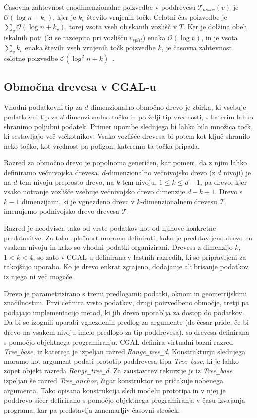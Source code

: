\documentclass[a4paper, 12pt]{book}
\newcommand{\T}{\ensuremath{\mathcal{T}}}
\newcommand{\OO}{\ensuremath{\mathcal{O}}} %
\newcommand{\U}{\texttt{\_}}
\begin{document}
Časovna zahtevnost enodimenzionalne poizvedbe v poddrevesu $\T_{assoc}(v)$ je $\OO(\log n + k_v)$, kjer je $k_v$ število vrnjenih točk. Celotni čas poizvedbe je $\sum_v\OO(\log n + k_v)$, torej vsota vseh obiskanih vozlišč v $T$. Ker je dolžina obeh iskalnih poti (ki se razcepita pri vozlišču $v_{split}$) enaka $\OO(\log n)$, in je vsota $\sum_v k_v$ enaka številu vseh vrnjenih točk poizvedbe $k$, je časovna zahtevnost celotne poizvedbe $\OO(\log^2n + k)$~\cite[poglavje 5.3]{bkos-08-all}.

\subsection{Območna drevesa v CGAL-u}
Vhodni podatkovni tip za $d$-dimenzionalno območno drevo je zbirka, ki vsebuje podatkovni tip za $d$-dimenzionalno točko in po želji tip vrednosti, s katerim lahko shranimo poljubni podatek. Primer uporabe slednjega bi lahko bila množica točk, ki sestavljajo več večkotnikov. Vsako vozlišče drevesa bi potem kot ključ shranilo neko točko, kot vrednost pa poligon, kateremu ta točka pripada. 

Razred za območno drevo je popolnoma generičen, kar pomeni, da z njim lahko definiramo večnivojska drevesa. $d$-dimenzionalno večnivojsko drevo  (z $d$ nivoji) je na $d$-tem nivoju preprosto drevo, na $k$-tem nivoju, $1 \leq k \leq d-1$, pa drevo, kjer vsako notranje vozlišče vsebuje večnivojsko drevo dimenzije $d-k+1$. Drevo s $k-1$ dimenzijami, ki je vgnezdeno drevo v $k$-dimenzionalnem drevesu \T, imenujemo podnivojsko drevo drevesa \T. 


Razred je neodvisen tako od vrste podatkov kot od njihove konkretne predstavitve. Za tako splošnost moramo definirati, kako je predstavljeno drevo na vsakem nivoju in kako so vhodni podatki organizirani. Drevesa z dimenzijo $k$, $ 1 < k < 4$, so zato v CGAL-u definirana v lastnih razredih, ki so pripravljeni za takojšnjo uporabo. Ko je drevo enkrat zgrajeno, dodajanje ali brisanje podatkov iz njega ni več mogoče.

\bigbreak
Drevo je parametrizirano s tremi predlogami: podatki, oknom in geometrijskimi značilnostmi. Prvi definira vrsto podatkov, drugi poizvedbeno območje, tretji pa podajajo implementacijo metod, ki jih drevo uporablja za dostop do podatkov. Da bi se izognili uporabi vgnezdenih predlog za argumente (do česar pride, če bi drevo na vsakem nivoju imelo predlogo za tip poddrevesa), so drevesa definirana s pomočjo objektnega programiranja. CGAL definira virtualni bazni razred \textit{Tree\U base}, iz katerega je izpeljan razred \textit{Range\U tree\U d}. Konstrukturju slednjega moramo kot argument podati prototip poddrevesa tipa \textit{Tree\U base}, ki je lahko zopet objekt razreda \textit{Range\U tree\U d}. Za zaustavitev rekurzije je iz \textit{Tree\U base} izpeljan še razred \textit{Tree\U anchor}, čigar konstruktor ne pričakuje nobenega argumenta. Tako opisana konstrukcija sledi modelu prototipa in v njej je poddrevo sicer definirano s pomočjo objektnega programiranja v času izvajanja programa, kar pa predstavlja zanemarljiv časovni strošek.
\end{document}
